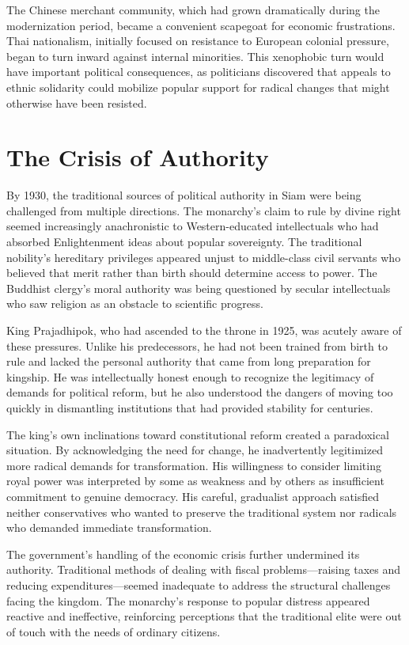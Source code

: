 \documentclass[
  Letterpaper,
]{scrbook}
\begin{document}
The Chinese merchant community, which had grown dramatically during the
modernization period, became a convenient scapegoat for economic
frustrations. Thai nationalism, initially focused on resistance to
European colonial pressure, began to turn inward against internal
minorities. This xenophobic turn would have important political
consequences, as politicians discovered that appeals to ethnic
solidarity could mobilize popular support for radical changes that might
otherwise have been resisted.

\section{The Crisis of Authority}\label{the-crisis-of-authority}

By 1930, the traditional sources of political authority in Siam were
being challenged from multiple directions. The monarchy's claim to rule
by divine right seemed increasingly anachronistic to Western-educated
intellectuals who had absorbed Enlightenment ideas about popular
sovereignty. The traditional nobility's hereditary privileges appeared
unjust to middle-class civil servants who believed that merit rather
than birth should determine access to power. The Buddhist clergy's moral
authority was being questioned by secular intellectuals who saw religion
as an obstacle to scientific progress.

King Prajadhipok, who had ascended to the throne in 1925, was acutely
aware of these pressures. Unlike his predecessors, he had not been
trained from birth to rule and lacked the personal authority that came
from long preparation for kingship. He was intellectually honest enough
to recognize the legitimacy of demands for political reform, but he also
understood the dangers of moving too quickly in dismantling institutions
that had provided stability for centuries.

The king's own inclinations toward constitutional reform created a
paradoxical situation. By acknowledging the need for change, he
inadvertently legitimized more radical demands for transformation. His
willingness to consider limiting royal power was interpreted by some as
weakness and by others as insufficient commitment to genuine democracy.
His careful, gradualist approach satisfied neither conservatives who
wanted to preserve the traditional system nor radicals who demanded
immediate transformation.

The government's handling of the economic crisis further undermined its
authority. Traditional methods of dealing with fiscal problems---raising
taxes and reducing expenditures---seemed inadequate to address the
structural challenges facing the kingdom. The monarchy's response to
popular distress appeared reactive and ineffective, reinforcing
perceptions that the traditional elite were out of touch with the needs
of ordinary citizens.
\end{document}
